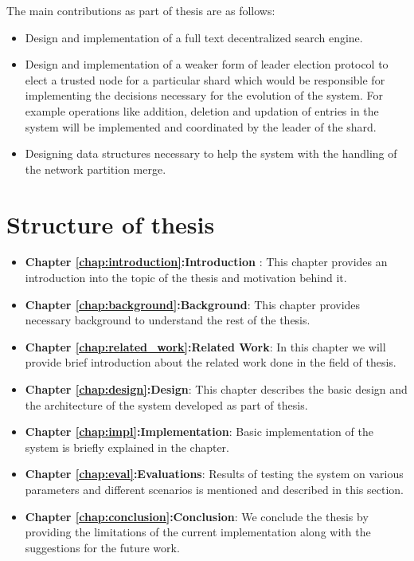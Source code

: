 \documentclass[12pt,a4paper,twoside,openright]{book}
\begin{document}
The main contributions as part of thesis are as follows:

\begin{itemize}
	\item Design and implementation of a full text decentralized search engine.
	\item Design and implementation of a weaker form of leader election protocol to elect a trusted node for a particular shard which would be responsible for implementing the decisions necessary for the evolution of the system. For example operations like addition, deletion and updation of entries in the system will be implemented and coordinated by the leader of the shard.
	\item Designing data structures necessary to help the system with the handling of the network partition merge.
		
\end{itemize}



\section{Structure of thesis}
\label{sec:thesis_structure}

\begin{itemize}

\item[] \textbf{Chapter \ref{chap:introduction}:Introduction} : This chapter provides an introduction into the topic of the thesis and motivation behind it.

\item[] \textbf{Chapter \ref{chap:background}:Background}: This chapter provides necessary background to understand the rest of the thesis.

\item[] \textbf{Chapter \ref{chap:related_work}:Related Work}: In this chapter we will provide brief introduction about the related work done in the field of thesis.

\item[] \textbf{Chapter \ref{chap:design}:Design}: This chapter describes the basic design and the architecture of the system developed as part of thesis.

\item[] \textbf{Chapter \ref{chap:impl}:Implementation}: Basic implementation of the system is briefly explained in the chapter.

\item[] \textbf{Chapter \ref{chap:eval}:Evaluations}: Results of testing the system on various parameters and different scenarios is mentioned and described in this section.

\item[] \textbf{Chapter \ref{chap:conclusion}:Conclusion}: We conclude the thesis by providing the limitations of the current implementation along with the suggestions for the future work.

\end{itemize}
\end{document}
